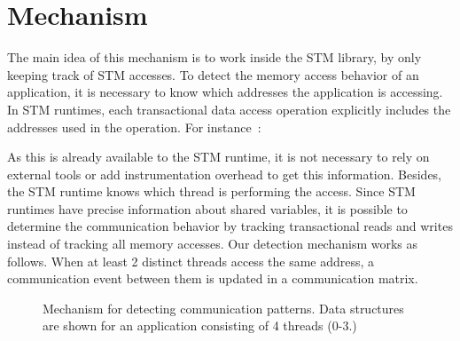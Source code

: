 \section{Mechanism}

The main idea of this mechanism is to work inside the STM library, by only keeping track of STM accesses. To detect the memory access behavior of an application, it is necessary to know which addresses the application is accessing. In STM runtimes, each transactional data access operation explicitly includes the addresses used in the operation. For instance~\cite{Harris:2010}:

 \begin{center}
 	
 \end{center}

As this is already available to the STM runtime, it is not necessary to rely on external tools or add instrumentation overhead to get this information.  Besides, the STM runtime knows which thread is performing the access. Since STM runtimes have precise information about shared variables, it is possible to determine the communication behavior by tracking transactional reads and writes instead of tracking all memory accesses. Our detection mechanism works as follows. When at least 2 distinct threads access the same address, a communication event between them is updated in a communication matrix. %

\begin{figure}[!ht]
	\centering
	\caption{Mechanism for detecting communication patterns. Data structures are shown for an application consisting of 4 threads (0-3.)}
	\label{fig:mechanism}
\end{figure}


